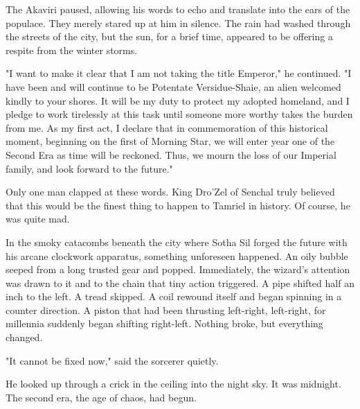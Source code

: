 The Akaviri paused, allowing his words to echo and translate into the ears of the populace. They merely stared up at him in silence. The rain had washed through the streets of the city, but the sun, for a brief time, appeared to be offering a respite from the winter storms.

"I want to make it clear that I am not taking the title Emperor," he continued. "I have been and will continue to be Potentate Versidue-Shaie, an alien welcomed kindly to your shores. It will be my duty to protect my adopted homeland, and I pledge to work tirelessly at this task until someone more worthy takes the burden from me. As my first act, I declare that in commemoration of this historical moment, beginning on the first of Morning Star, we will enter year one of the Second Era as time will be reckoned. Thus, we mourn the loss of our Imperial family, and look forward to the future."

Only one man clapped at these words. King Dro'Zel of Senchal truly believed that this would be the finest thing to happen to Tamriel in history. Of course, he was quite mad.

In the smoky catacombs beneath the city where Sotha Sil forged the future with his arcane clockwork apparatus, something unforeseen happened. An oily bubble seeped from a long trusted gear and popped. Immediately, the wizard's attention was drawn to it and to the chain that tiny action triggered. A pipe shifted half an inch to the left. A tread skipped. A coil rewound itself and began spinning in a counter direction. A piston that had been thrusting left-right, left-right, for millennia suddenly began shifting right-left. Nothing broke, but everything changed.

"It cannot be fixed now," said the sorcerer quietly.

He looked up through a crick in the ceiling into the night sky. It was midnight. The second era, the age of chaos, had begun.